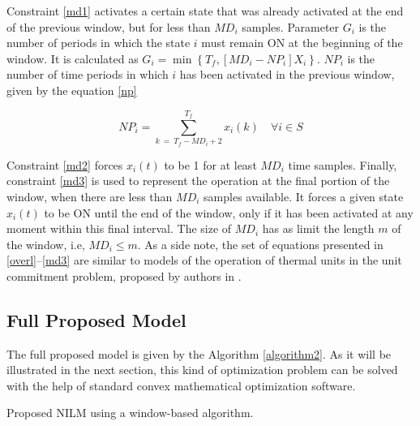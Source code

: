 Constraint \eqref{md1} activates a certain state that was already activated at the end of the previous window, but for less than $MD_i$ samples. Parameter $G_i$ is the number of periods in which the state $i$ must remain ON at the beginning of the window. It is calculated as $G_i = \min \left\{ T_f, \left[ MD_i - NP_i \right] X_i \right\}$. $NP_i$ is the number of time periods in which $i$ has been activated in the previous window, given by the equation \eqref{np}

\begin{equation} \label{np}
    NP_i = \sum_{k\ =\ T_f - MD_i + 2}^{T_f} { x_i(k) } \quad \forall i \in S
\end{equation}

Constraint \eqref{md2} forces $x_i(t)$ to be 1 for at least $MD_i$ time samples. Finally, constraint \eqref{md3} is used to represent the operation at the final portion of the window, when there are less than $MD_i$ samples available. It forces a given state $x_i(t)$ to be ON until the end of the window, only if it has been activated at any moment within this final interval. The size of $MD_i$ has as limit the length $m$ of the window, i.e, $MD_i \leq m$. 
As a side note, the set of equations presented in \eqref{overl}--\eqref{md3} are similar to models of the operation of thermal units in the unit commitment problem, proposed by authors in \cite{carrion2006}.

\subsection{Full Proposed Model}

The full proposed model is given by the Algorithm \ref{algorithm2}. As it will be illustrated in the next section, this kind of optimization problem can be solved with the help of standard convex mathematical optimization software. 

\begin{algorithm}[H]\label{algorithm2}
\SetAlgoLined
\caption{Proposed NILM using a window-based algorithm.}
\end{algorithm}


